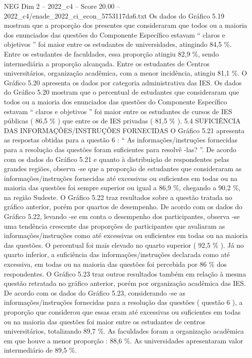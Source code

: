 \begin{textsample}{NEG Dim 2 – 2022\_c4 – Score 20.00 – 2022\_c4/enade\_2022\_ci\_econ\_5753117da6.txt}
Os dados do Gráfico 5.19 mostram que a proporção dos presentes que consideraram que todos ou a maioria dos enunciados das questões do Componente Específico estavam “ claros e objetivos ” foi maior entre os estudantes de universidades, atingindo 84,5 \%.
Entre os estudantes de faculdades, essa proporção atingiu 82,9 \%, sendo intermediária a proporção alcançada.
Entre os estudantes de Centros universitários, organização acadêmica, com a menor incidência, atingiu 81,1 \%.
O Gráfico 5.20 apresenta os dados por categoria administrativa das IES.
Os dados do Gráfico 5.20 mostram que o percentual de estudantes que consideraram que todos ou a maioria dos enunciados das questões do Componente Específico estavam “ claros e objetivos ” foi maior entre os estudantes de cursos de IES públicas ( 86,5 \% ) que entre os de IES privadas ( 81,5 \% ). 5.4 SUFICIÊNCIA DAS INFORMAÇÕES/INSTRUÇÕES FORNECIDAS O Gráfico 5.21 apresenta as respostas obtidas para a questão 6 : “ As informações/instruções fornecidas para a resolução das questões foram suficientes para resolvê -las? ”.
De acordo com os dados do Gráfico 5.21 e quanto à distribuição de respondentes pelas grandes regiões, observa -se que a proporção de estudantes que consideraram as informações/instruções fornecidas até excessivas ou suficientes em todas ou na maioria das questões foi sempre superior ou igual a 86,9 \%, chegando a 90,2 \%, na região Sudeste.
O Gráfico 5.22 traz resultados sobre a questão tratada no gráfico anterior, porém por quartos de desempenho.
De acordo com os dados do Gráfico 5.22, levando -se em conta o desempenho dos participantes, observa -se uma tendência crescente das proporções de participantes que avaliaram as informações/instruções como até excessivas ou suficientes em todas ou na maioria das questões.
O percentual foi mais elevado no quarto superior ( 92,5 \% ).
Já no quarto inferior, a suficiência das informações/instruções declarada como até excessiva, em todas ou na maioria das questões foi percebida por 86 \% dos respondentes.
O Gráfico 5.23 traz outros resultados também em relação à mesma questão retratada no gráfico anterior, porém por organização acadêmica das IES.
De acordo com os dados do Gráfico 5.23, considerando -se as informações/instruções fornecidas para a resolução das questões ( questão 6 ), a proporção que considerou que essas eram até excessivas ou suficientes em todas ou na maioria das questões foi maior entre os estudantes de centros universitários, totalizando 89,7 \%.
As faculdades foram a organização acadêmica em que houve a menor proporção : 88,6 \%.
As universidades apresentaram valor intermediário de 89,5 \%.

\end{textsample}
